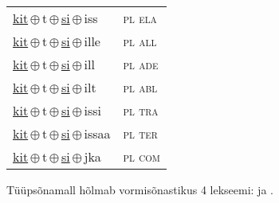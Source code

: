 \begin{minipage}{\textwidth}
\begin{sideways}
\begin{tabular}{l l}
\underline{kit}\,$\oplus$\,t\,$\oplus$\,\underline{si}\,$\oplus$\,iss & \textsc{ pl ela } \\
\underline{kit}\,$\oplus$\,t\,$\oplus$\,\underline{si}\,$\oplus$\,ille & \textsc{ pl all } \\
\underline{kit}\,$\oplus$\,t\,$\oplus$\,\underline{si}\,$\oplus$\,ill & \textsc{ pl ade } \\
\underline{kit}\,$\oplus$\,t\,$\oplus$\,\underline{si}\,$\oplus$\,ilt & \textsc{ pl abl } \\
\underline{kit}\,$\oplus$\,t\,$\oplus$\,\underline{si}\,$\oplus$\,issi & \textsc{ pl tra } \\
\underline{kit}\,$\oplus$\,t\,$\oplus$\,\underline{si}\,$\oplus$\,issaa & \textsc{ pl ter } \\
\underline{kit}\,$\oplus$\,t\,$\oplus$\,\underline{si}\,$\oplus$\,jka & \textsc{ pl com } \\
\end{tabular}
\end{sideways}
\label{tab:tüüpsõnamall-kittsi}

\end{minipage}

 
\vspace{1em}
\noindent Tüüpsõnamall  hõlmab vormisõnastikus 4 lekseemi:  ja .
